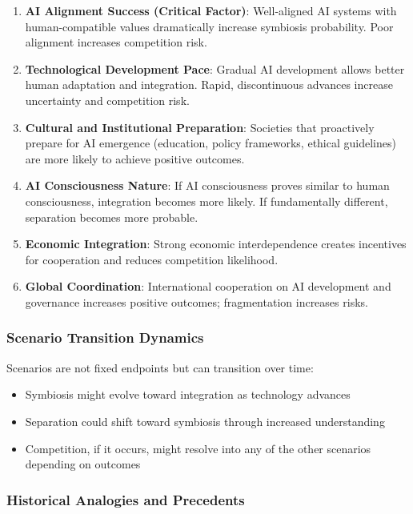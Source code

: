 \documentclass[12pt,a4paper]{article}
\begin{document}
\begin{enumerate}
    \item \textbf{AI Alignment Success (Critical Factor)}: Well-aligned AI systems with human-compatible values dramatically increase symbiosis probability. Poor alignment increases competition risk.
    \item \textbf{Technological Development Pace}: Gradual AI development allows better human adaptation and integration. Rapid, discontinuous advances increase uncertainty and competition risk.
    \item \textbf{Cultural and Institutional Preparation}: Societies that proactively prepare for AI emergence (education, policy frameworks, ethical guidelines) are more likely to achieve positive outcomes.
    \item \textbf{AI Consciousness Nature}: If AI consciousness proves similar to human consciousness, integration becomes more likely. If fundamentally different, separation becomes more probable.
    \item \textbf{Economic Integration}: Strong economic interdependence creates incentives for cooperation and reduces competition likelihood.
    \item \textbf{Global Coordination}: International cooperation on AI development and governance increases positive outcomes; fragmentation increases risks.
\end{enumerate}

\subsubsection{Scenario Transition Dynamics}

Scenarios are not fixed endpoints but can transition over time:
\begin{itemize}
    \item Symbiosis might evolve toward integration as technology advances
    \item Separation could shift toward symbiosis through increased understanding
    \item Competition, if it occurs, might resolve into any of the other scenarios depending on outcomes
\end{itemize}

\subsubsection{Historical Analogies and Precedents}
\end{document}
